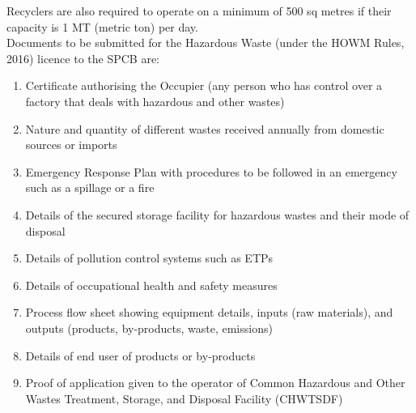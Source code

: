 \documentclass[a4paper, 12pt]{article}
\begin{document}
\begin{mdframed}[backgroundcolor=gray!20]
            Recyclers are also required to operate on a minimum of 500 sq metres if their capacity is 1 MT (metric ton) per day.\\
            
            Documents to be submitted for the Hazardous Waste (under the HOWM Rules, 2016) licence to the SPCB are:
        
        \begin{enumerate}
        	\item Certificate authorising the Occupier (any person who has control over a factory that deals with hazardous and other wastes)
        	\item Nature and quantity of different wastes received annually from domestic sources or imports
        	\item Emergency Response Plan with procedures to be followed in an emergency such as a spillage or a fire
        	\item Details of the secured storage facility for hazardous wastes and their mode of disposal
        	\item Details of pollution control systems such as ETPs
        	\item Details of occupational health and safety measures
        	\item Process flow sheet showing equipment details, inputs (raw materials), and outputs (products, by-products, waste, emissions)
        	\item Details of end user of products or by-products
        	\item Proof of application given to the operator of Common Hazardous and Other Wastes Treatment, Storage, and Disposal Facility (CHWTSDF)
        
        \end{enumerate}
        
            \end{mdframed}
         
         
             \newpage       
\end{document}

